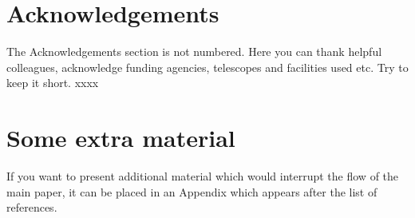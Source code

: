 \documentclass[fleqn,usenatbib]{mnras}
\begin{document}
\section*{Acknowledgements}

The Acknowledgements section is not numbered. Here you can thank helpful
colleagues, acknowledge funding agencies, telescopes and facilities used etc.
Try to keep it short. xxxx











\appendix

\section{Some extra material}

If you want to present additional material which would interrupt the flow of the main paper,
it can be placed in an Appendix which appears after the list of references.



\bsp	%
\label{lastpage}
\end{document}
